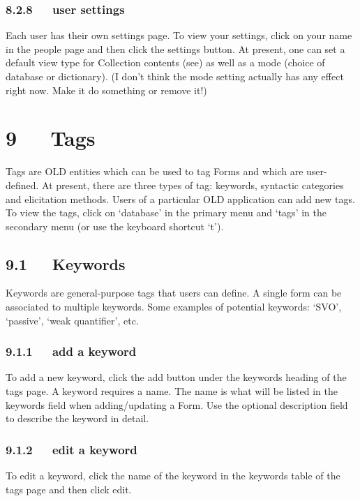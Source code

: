 \documentclass[letterpaper,10pt,english]{sphinxmanual}
\begin{document}
\subsection{8.2.8   user settings}
\label{user_guide:user-settings}
Each user has their own settings page.  To view your settings, click on your
name in the people page and then click the settings button.  At present, one
can set a default view type for Collection contents (see) as well as a mode
(choice of database or dictionary).  (I don't think the mode setting actually
has any effect right now.  Make it do something or remove it!)


\chapter{9   Tags}
\label{user_guide:tags}
Tags are OLD entities which can be used to tag Forms and which are user-defined.
At present, there are three types of tag: keywords, syntactic categories and
elicitation methods.  Users of a particular OLD application can add new tags.
To view the tags, click on `database' in the primary menu and `tags' in the
secondary menu (or use the keyboard shortcut `t').


\section{9.1   Keywords}
\label{user_guide:id20}
Keywords are general-purpose tags that users can define.  A single form can be
associated to multiple keywords.  Some examples of potential keywords: `SVO',
`passive', `weak quantifier', etc.


\subsection{9.1.1   add a keyword}
\label{user_guide:add-a-keyword}
To add a new keyword, click the add button under the keywords heading of the
tags page.  A keyword requires a name.  The name is what will be listed in the
keywords field when adding/updating a Form.  Use the optional description field
to describe the keyword in detail.


\subsection{9.1.2   edit a keyword}
\label{user_guide:edit-a-keyword}
To edit a keyword, click the name of the keyword in the keywords table of the
tags page and then click edit.
\end{document}
